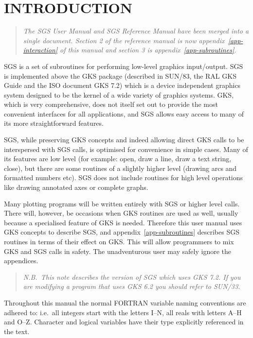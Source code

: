 {\setlength{\parskip}{0mm}\tableofcontents}
\markright{\stardocname}

\section{INTRODUCTION}

\begin{quote}
{\em The SGS User Manual and SGS Reference Manual have been merged into
a single document. Section 2 of the reference manual is now
appendix~\ref{app-interaction} of this manual and section 3 is
appendix~\ref{app-subroutines}.}
\end{quote}

SGS is a set of subroutines for performing low-level graphics input/output.
SGS is implemented above the GKS package (described in SUN/83, the RAL GKS Guide
and the ISO document GKS 7.2) which is a device independent graphics system
designed to be the kernel of a wide variety of graphics systems.
GKS, which is very comprehensive, does not itself set out to provide the most
convenient interfaces for all applications, and SGS allows easy access to many
of its more straightforward features. 

SGS, while preserving GKS concepts and indeed allowing direct GKS calls to be
interspersed with SGS calls, is optimised for convenience in simple cases.
Many of its features are low level (for example: open, draw a line, draw a text
string, close), but there are some routines of a slightly higher level (drawing
arcs and formatted numbers etc). 
SGS does not include routines for high level operations like drawing annotated
axes or complete graphs.

Many plotting programs will be written entirely with SGS or higher level calls.
There will, however, be occasions when GKS routines are used as well, usually
because a specialised feature of GKS is needed. Therefore this user manual uses
GKS concepts to describe SGS, and appendix~\ref{app-subroutines} describes SGS
routines in terms of their effect on GKS. This will allow programmers to mix
GKS and SGS calls in safety. The unadventurous user may safely ignore the
appendices.
 
\begin{quote}
{\em N.B.\ This note describes the version of SGS which uses GKS 7.2.
If you are modifying a program that uses GKS 6.2 you should refer to SUN/33.}
\end{quote}

Throughout this manual the normal FORTRAN variable naming conventions are
adhered to:  i.e.\ all integers start with the letters I--N, all reals with
letters A--H and O--Z. Character and logical variables have their type
explicitly referenced in the text.


